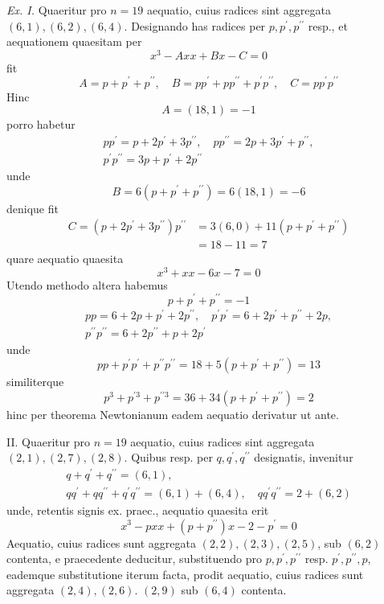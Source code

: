 \textit{Ex. I.} Quaeritur pro \(n=19\) aequatio, cuius radices sint aggregata \((6,1),\allowbreak (6,2),\allowbreak (6,4)\). Designando has radices per \(p,\allowbreak p^{\prime},\allowbreak p^{\prime\prime}\) resp., et aequationem quaesitam per \[x^3-Axx+Bx-C=0\] fit \[A=p+p^{\prime}+p^{\prime\prime},\quad B=pp^{\prime}+pp^{\prime\prime}+p^{\prime}p^{\prime\prime},\quad C=pp^{\prime}p^{\prime\prime}\] Hinc \[A=(18,1)=-1\] porro habetur
\[\begin{gathered}
pp^{\prime}=p+2p^{\prime}+3p^{\prime\prime},\quad pp^{\prime\prime}=2p+3p^{\prime}+p^{\prime\prime},\\
p^{\prime}p^{\prime\prime}=3p+p^{\prime}+2p^{\prime\prime}
\end{gathered}\] unde \[B=6(p+p^{\prime}+p^{\prime\prime})=6(18,1)=-6\] denique fit \[\begin{aligned}
C=(p+2p^{\prime}+3p^{\prime\prime})p^{\prime\prime}&=3(6,0)+11(p+p^{\prime}+p^{\prime\prime})\\
&=18-11=7
\end{aligned}\] quare aequatio quaesita \[x^3+xx-6x-7=0\] Utendo methodo altera habemus \[p+p^{\prime}+p^{\prime\prime}=-1\] \[\begin{gathered}
pp=6+2p+p^{\prime}+2p^{\prime\prime},\quad p^{\prime}p^{\prime}=6+2p^{\prime}+p^{\prime\prime}+2p,\\
p^{\prime\prime}p^{\prime\prime}=6+2p^{\prime\prime}+p+2p^{\prime}
\end{gathered}\] unde \[pp+p^{\prime}p^{\prime}+p^{\prime\prime}p^{\prime\prime}=18+5(p+p^{\prime}+p^{\prime\prime})=13\] similiterque \[p^3+p^{\prime3}+p^{\prime\prime3}=36+34(p+p^{\prime}+p^{\prime\prime})=2\] hinc per theorema Newtonianum eadem aequatio derivatur ut ante.

II. Quaeritur pro \(n=19\) aequatio, cuius radices sint aggregata \((2,1),\allowbreak (2,7),\allowbreak (2,8)\). Quibus resp. per \(q,\allowbreak q^{\prime},\allowbreak q^{\prime\prime}\) designatis, invenitur \[\begin{gathered}
q+q^{\prime}+q^{\prime\prime}=(6,1),\\
qq^{\prime}+qq^{\prime\prime}+q^{\prime}q^{\prime\prime}=(6,1)+(6,4),\quad qq^{\prime}q^{\prime\prime}=2+(6,2)
\end{gathered}\] unde, retentis signis ex. praec., aequatio quaesita erit \[x^3-pxx+(p+p^{\prime\prime})x-2-p^{\prime}=0\] Aequatio, cuius radices sunt aggregata \((2,2),\allowbreak (2,3),\allowbreak (2,5)\), sub \((6,2)\) contenta, e praecedente deducitur, substituendo pro \(p,\allowbreak p^{\prime},\allowbreak p^{\prime\prime}\) resp. \(p^{\prime},\allowbreak p^{\prime\prime},\allowbreak p\), eademque substitutione iterum facta, prodit aequatio, cuius radices sunt aggregata \((2,4),\allowbreak (2,6)\). \((2,9)\) sub \((6,4)\) contenta.

